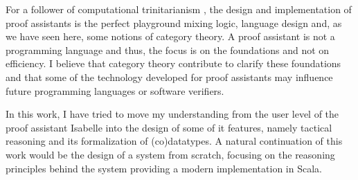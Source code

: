 \documentclass[notitlepage]{article}
\begin{document}
For a follower of computational trinitarianism \cite{trinity}, the design and implementation of proof assistants is the perfect playground mixing logic, language design and, as we have seen here, some notions of category theory. A proof assistant is not a programming language and thus, the focus is on the foundations and not on efficiency. I believe that category theory contribute to clarify these foundations and that some of the technology developed for proof assistants may influence future programming languages or software verifiers. 

In this work, I have tried to move my understanding from the user level of the proof assistant Isabelle into the design of some of it features, namely tactical reasoning and its formalization of (co)datatypes. A natural continuation of this work would be the design of a system from scratch, focusing on the reasoning principles behind the system providing a modern implementation in Scala. 


\newpage
\printbibliography
\end{document}

